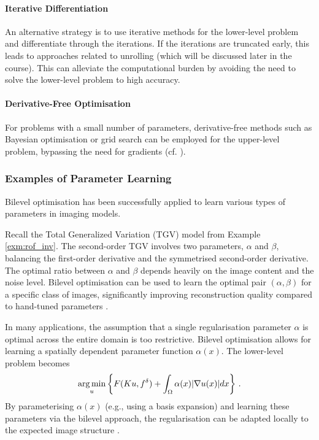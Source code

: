 \paragraph{Iterative Differentiation} An alternative strategy is to use iterative methods for the lower-level problem and differentiate through the iterations. If the iterations are truncated early, this leads to approaches related to unrolling (which will be discussed later in the course). This can alleviate the computational burden by avoiding the need to solve the lower-level problem to high accuracy.

\paragraph{Derivative-Free Optimisation} For problems with a small number of parameters, derivative-free methods such as Bayesian optimisation or grid search can be employed for the upper-level problem, bypassing the need for gradients (cf. \cite{ehrhardt2023inexact}).

\subsubsection*{Examples of Parameter Learning}
Bilevel optimisation has been successfully applied to learn various types of parameters in imaging models.

\begin{exm}\normalfont
Recall the Total Generalized Variation (TGV) model from Example \ref{exm:rof_inv}. The second-order TGV involves two parameters, $\alpha$ and $\beta$, balancing the first-order derivative and the symmetrised second-order derivative. The optimal ratio between $\alpha$ and $\beta$ depends heavily on the image content and the noise level. Bilevel optimisation can be used to learn the optimal pair $(\alpha, \beta)$ for a specific class of images, significantly improving reconstruction quality compared to hand-tuned parameters \cite{holler2021bilevel, bubba2023bilevel}.
\end{exm}

\begin{exm}\normalfont
In many applications, the assumption that a single regularisation parameter $\alpha$ is optimal across the entire domain is too restrictive. Bilevel optimisation allows for learning a spatially dependent parameter function $\alpha(x)$. The lower-level problem becomes
$$ \operatorname*{arg\,min}_{u} \left\{ F(K u, f^\delta) + \int_\Omega \alpha(x) |\nabla u(x)| dx \right\} \, . $$
By parameterising $\alpha(x)$ (e.g., using a basis expansion) and learning these parameters via the bilevel approach, the regularisation can be adapted locally to the expected image structure \cite{delosreyes2016learning}.
\end{exm}


